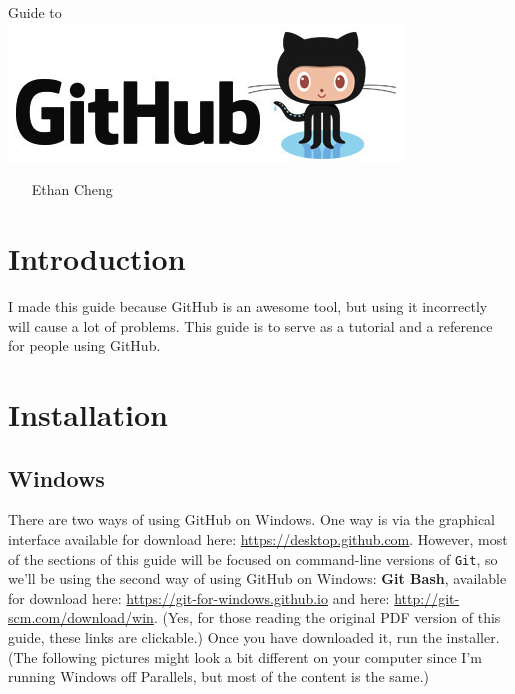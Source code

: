 \documentclass[11pt,fleqn]{article}
\theoremstyle{definition}
\begin{document}
\vspace*{\fill}
\begin{center}
{\Huge
Guide to \hspace{4.4cm} \texttt{ }
}\\
\includegraphics[scale=0.6]{GitHubLogo.jpg}
\end{center}
\begin{center}
\texttt{ } \newline
\texttt{ } \newline
Ethan Cheng
\end{center}
\vspace*{\fill}

\newpage
\tableofcontents

\newpage
\section{Introduction}
I made this guide because GitHub is an awesome tool, but using it incorrectly will cause a lot of problems. This guide is to serve as a tutorial and a reference for people using GitHub.

\section{Installation}
\subsection{Windows}
There are two ways of using GitHub on Windows. One way is via the graphical interface available for download here: \url{https://desktop.github.com}. However, most of the sections of this guide will be focused on command-line versions of \texttt{Git}, so we'll be using the second way of using GitHub on Windows: \textbf{Git Bash}, available for download here: \url{https://git-for-windows.github.io} and here: \url{http://git-scm.com/download/win}. (Yes, for those reading the original PDF version of this guide, these links are clickable.) Once you have downloaded it, run the installer. (The following pictures might look a bit different on your computer since I'm running Windows off Parallels, but most of the content is the same.)
\end{document}
